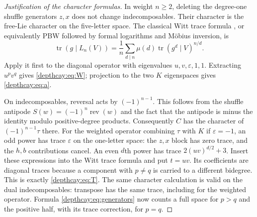 \begin{proof}[Justification of the character formulas]
In weight $n\ge2$, deleting the degree-one shuffle generators $z,x$
does not change indecomposables. Their character is the free-Lie
character on the five-letter space. The classical Witt trace formula
\cite{depth:Reutenauer}, or equivalently PBW followed by formal logarithms
and M\"obius inversion, is
\[
 \operatorname{tr}(g\mid L_n(V))
 =\frac1n\sum_{d\mid n}\mu(d)
       \operatorname{tr}(g^d\mid V)^{n/d}.
\]
Apply it first to the diagonal operator with eigenvalues
$u,v,\varepsilon,1,1$. Extracting $u^pv^q$ gives
\eqref{depthcay:eq:W}; projection to the two $K$ eigenspaces gives
\eqref{depthcay:eq:a}.

On indecomposables, reversal acts by $(-1)^{n-1}$. This follows from
the shuffle antipode $S(w)=(-1)^n\operatorname{rev}(w)$ and the fact
that the antipode is minus the identity modulo positive-degree products.
Consequently $C$ has the character of $(-1)^{n-1}\tau$ there.
For the weighted operator combining $\tau$ with $K$ if
$\varepsilon=-1$, an odd power has trace $\varepsilon$ on the
one-letter space: the $z,x$ block has zero trace, and the $h,b$
contributions cancel. An even $d$th power has trace
$2(uv)^{d/2}+3$. Insert these expressions into the Witt trace formula
and put $t=uv$. Its coefficients are diagonal traces because a component
with $p\ne q$ is carried to a different bidegree. This is exactly
\eqref{depthcay:eq:T}. The same character calculation is valid on
the dual indecomposables: transpose has the same trace, including for
the weighted operator. Formula \eqref{depthcay:eq:generators} now
counts a full space for $p>q$ and the positive half, with its trace
correction, for $p=q$.
\end{proof}

